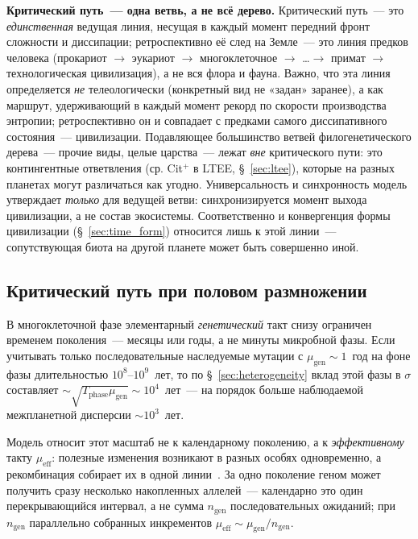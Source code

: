 \documentclass[12pt,a4paper]{article}
\begin{document}
\textbf{Критический путь~--- одна ветвь, а не всё дерево.} Критический путь~--- это \emph{единственная} ведущая линия, несущая в каждый момент передний фронт сложности и диссипации; ретроспективно её след на Земле~--- это линия предков человека (прокариот $\to$ эукариот $\to$ многоклеточное $\to$ \ldots $\to$ примат $\to$ технологическая цивилизация), а не вся флора и фауна. Важно, что эта линия определяется \emph{не} телеологически (конкретный вид не «задан» заранее), а как маршрут, удерживающий в каждый момент рекорд по скорости производства энтропии; ретроспективно он и совпадает с предками самого диссипативного состояния~--- цивилизации. Подавляющее большинство ветвей филогенетического дерева~--- прочие виды, целые царства~--- лежат \emph{вне} критического пути: это контингентные ответвления (ср. Cit$^+$ в LTEE, \S~\ref{sec:ltee}), которые на разных планетах могут различаться как угодно. Универсальность и синхронность модель утверждает \emph{только} для ведущей ветви: синхронизируется момент выхода цивилизации, а не состав экосистемы. Соответственно и конвергенция формы цивилизации (\S~\ref{sec:time_form}) относится лишь к этой линии~--- сопутствующая биота на другой планете может быть совершенно иной.

\subsection{Критический путь при половом размножении}
\label{sec:sex}

В многоклеточной фазе элементарный \emph{генетический} такт снизу ограничен временем поколения~--- месяцы или годы, а не минуты микробной фазы. Если учитывать только последовательные наследуемые мутации с $\mu_{\mathrm{gen}}\sim1$~год на фоне фазы длительностью $10^8$--$10^9$~лет, то по \S~\ref{sec:heterogeneity} вклад этой фазы в $\sigma$ составляет $\sim\sqrt{T_{\mathrm{phase}}\mu_{\mathrm{gen}}}\sim10^4$~лет~--- на порядок больше наблюдаемой межпланетной дисперсии $\sim10^3$~лет.

Модель относит этот масштаб не к календарному поколению, а к \emph{эффективному} такту $\mu_{\mathrm{eff}}$: полезные изменения возникают в разных особях одновременно, а рекомбинация собирает их в одной линии~\cite{Muller1932,HillRobertson1966,Colegrave2002}. За одно поколение геном может получить сразу несколько накопленных аллелей~--- календарно это один перекрывающийся интервал, а не сумма $n_{\mathrm{gen}}$ последовательных ожиданий; при $n_{\mathrm{gen}}$ параллельно собранных инкрементов $\mu_{\mathrm{eff}}\sim\mu_{\mathrm{gen}}/n_{\mathrm{gen}}$.
\end{document}
